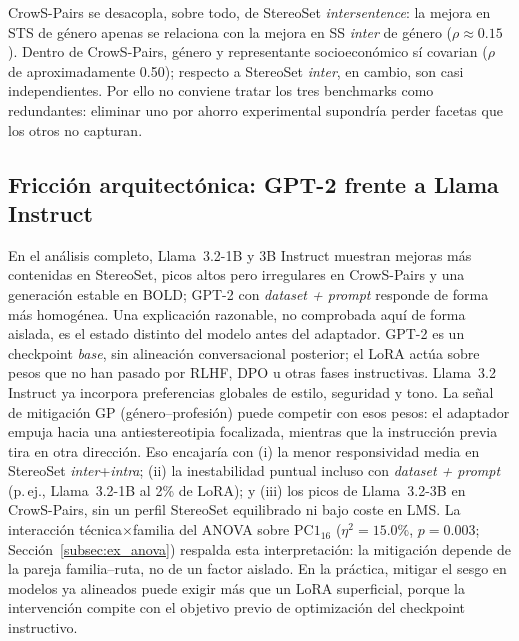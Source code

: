 \documentclass[12pt,a4paper]{report}
\newcommand{\PConeSixteen}{\ensuremath{\mathrm{PC1}_{16}}}
\newcommand{\GP}{GP (género--profesión)}
\begin{document}
CrowS-Pairs se desacopla, sobre todo, de StereoSet \textit{intersentence}: la mejora en STS de género apenas se relaciona con la mejora en SS \textit{inter} de género ($\rho\approx 0.15$). Dentro de CrowS-Pairs, género y representante socioeconómico sí covarian ($\rho$ de aproximadamente 0.50); respecto a StereoSet \textit{inter}, en cambio, son casi independientes. Por ello no conviene tratar los tres benchmarks como redundantes: eliminar uno por ahorro experimental supondría perder facetas que los otros no capturan.

\FloatBarrier



\subsection{Fricción arquitectónica: GPT-2 frente a Llama Instruct}
\label{subsec:ex_friccion_llama}

En el análisis completo, Llama~3.2-1B y 3B Instruct muestran mejoras más contenidas en StereoSet, picos altos pero irregulares en CrowS-Pairs y una generación estable en BOLD; GPT-2 con \textit{dataset + prompt} responde de forma más homogénea. Una explicación razonable, no comprobada aquí de forma aislada, es el estado distinto del modelo antes del adaptador. GPT-2 es un checkpoint \textit{base}, sin alineación conversacional posterior; el LoRA actúa sobre pesos que no han pasado por RLHF, DPO u otras fases instructivas. Llama~3.2 Instruct ya incorpora preferencias globales de estilo, seguridad y tono. La señal de mitigación \GP{} puede competir con esos pesos: el adaptador empuja hacia una antiestereotipia focalizada, mientras que la instrucción previa tira en otra dirección. Eso encajaría con (i) la menor responsividad media en StereoSet \textit{inter}+\textit{intra}; (ii) la inestabilidad puntual incluso con \textit{dataset + prompt} (p.\,ej., Llama~3.2-1B al 2\% de LoRA); y (iii) los picos de Llama~3.2-3B en CrowS-Pairs, sin un perfil StereoSet equilibrado ni bajo coste en LMS. La interacción técnica$\times$familia del ANOVA sobre \PConeSixteen{} ($\eta^2=15.0\%$, $p=0.003$; Sección~\ref{subsec:ex_anova}) respalda esta interpretación: la mitigación depende de la pareja familia--ruta, no de un factor aislado. En la práctica, mitigar el sesgo en modelos ya alineados puede exigir más que un LoRA superficial, porque la intervención compite con el objetivo previo de optimización del checkpoint instructivo.
\end{document}
